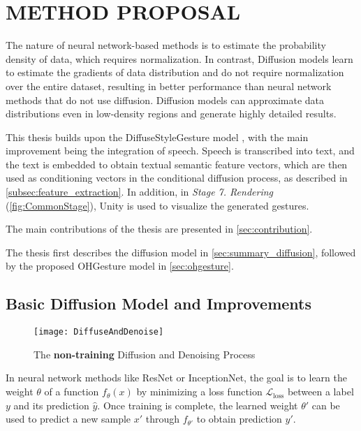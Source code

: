 \chapter{METHOD PROPOSAL}
\label{chap:Chapter3}

The nature of neural network-based methods is to estimate the probability density of data, which requires normalization. In contrast, Diffusion models learn to estimate the gradients of data distribution \cite{song2021score} and do not require normalization over the entire dataset, resulting in better performance than neural network methods that do not use diffusion. Diffusion models can approximate data distributions even in low-density regions and generate highly detailed results.

This thesis builds upon the DiffuseStyleGesture model \cite{yang2022DiffuseStyleGestureplus}, with the main improvement being the integration of speech. Speech is transcribed into text, and the text is embedded to obtain textual semantic feature vectors, which are then used as conditioning vectors in the conditional diffusion process, as described in \autoref{subsec:feature_extraction}. In addition, in \textit{Stage 7. Rendering} (\autoref{fig:CommonStage}), Unity is used to visualize the generated gestures.

The main contributions of the thesis are presented in \autoref{sec:contribution}.

The thesis first describes the diffusion model in \autoref{sec:summary_diffusion}, followed by the proposed OHGesture model in \autoref{sec:ohgesture}.

\section{Basic Diffusion Model and Improvements}
\label{sec:summary_diffusion}

\begin{figure}[H]
	\centering
	\texttt{[image: DiffuseAndDenoise]}
	\caption{The \textbf{non-training} Diffusion and Denoising Process}
	\label{fig:DiffuseAndDenoise}
\end{figure}

In neural network methods like ResNet or InceptionNet, the goal is to learn the weight $\theta$ of a function $f_{\theta}(x)$ by minimizing a loss function $\mathcal{L}_\text{loss}$ between a label $y$ and its prediction $\hat{y}$. Once training is complete, the learned weight $\theta'$ can be used to predict a new sample $x'$ through $f_{\theta'}$ to obtain prediction $y'$.

